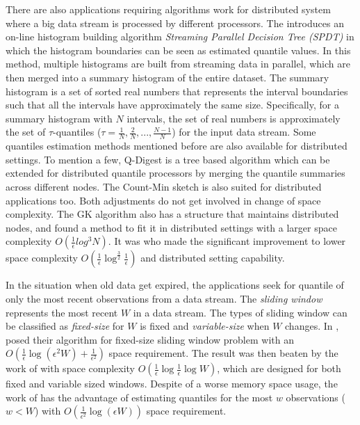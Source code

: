 There are also applications requiring algorithms work for distributed system where a big data stream is processed by different processors.
The \citeauthor{ben-haimStreamingParallelDecision2010}\cite{ben-haimStreamingParallelDecision2010} introduces an on-line histogram building algorithm \textit{Streaming Parallel Decision Tree (SPDT)} in which the histogram boundaries can be seen as estimated quantile values.
In this method, multiple histograms are built from streaming data in parallel, which are then merged into a summary histogram of the entire dataset. The summary histogram is a set of sorted real numbers that represents the interval boundaries such that all the intervals have approximately the same size. Specifically, for a summary histogram with $N$ intervals, the set of real numbers is approximately the set of $\tau$-quantiles ($\tau = \frac{1}{N}, \frac{2}{N}, ..., \frac{N-1}{N}$) for the input data stream.
Some quantiles estimation methods mentioned before are also available for distributed settings. To mention a few,
{Q-Digest}\cite{shrivastavaMediansNewAggregation2004b} is a tree based algorithm which can be extended for distributed quantile processors by merging the quantile summaries across different nodes. The Count-Min sketch\cite{cormodeImprovedDataStream2005} is also suited for distributed applications too. Both adjustments do not get involved in change of space complexity.
The {GK} algorithm also has a structure that maintains distributed nodes, and \citeauthor{greenwaldPowerconservingComputationOrderstatistics2004}\cite{greenwaldPowerconservingComputationOrderstatistics2004} found a method to fit it in distributed settings with a larger space complexity $O(\frac{1}{\epsilon}log^3 N)$.
It was \citeauthor{agarwalMergeableSummaries2013}\cite{agarwalMergeableSummaries2013} who made the significant improvement to lower space complexity 
$O(\frac{1}{\epsilon}\log^{\frac{3}{2}}\frac{1}{\epsilon})$
and distributed setting capability.

In the situation when old data get expired, the applications seek for quantile of only the most recent observations from a data stream.
The \textit{sliding window} represents the most recent $W$ in a data stream. The types of sliding window can be classified as \textit{fixed-size} for $W$ is fixed and \textit{variable-size} when $W$ changes.
In \cite{linContinuouslyMaintainingQuantile2004}, \citeauthor{linContinuouslyMaintainingQuantile2004} posed their algorithm for fixed-size sliding window problem with an 
$O(\frac{1}{\epsilon} \log (\epsilon^2 W) + \frac{1}{\epsilon^2})$ space requirement.
The result was then beaten by the work of \citeauthor{arasuApproximateCountsQuantiles2004}\cite{arasuApproximateCountsQuantiles2004} with space complexity 
$O(\frac{1}{\epsilon} \log\frac{1}{\epsilon} \log W)$,
which are designed for both fixed and variable sized windows.
Despite of a worse memory space usage, the work of \citeauthor{linContinuouslyMaintainingQuantile2004}\cite{linContinuouslyMaintainingQuantile2004} has the advantage of estimating quantiles for the most $w$ observations ($w < W$) with $O(\frac{1}{\epsilon^2} \log (\epsilon W))$ space requirement.


